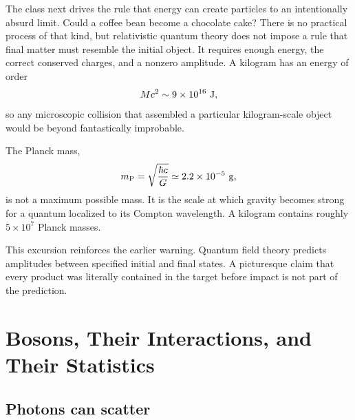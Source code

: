 The class next drives the rule that energy can create particles to an
intentionally absurd limit. Could a coffee bean become a chocolate cake?
There is no practical process of that kind, but relativistic quantum theory
does not impose a rule that final matter must resemble the initial object. It
requires enough energy, the correct conserved charges, and a nonzero
amplitude. A kilogram has an energy of order
\begin{equation}
  Mc^2\sim9\times10^{16}\ {\rm J},
\end{equation}
so any microscopic collision that assembled a particular kilogram-scale
object would be beyond fantastically improbable.

The Planck mass,
\begin{equation}
  m_{\rm P}=\sqrt{\frac{\hbar c}{G}}
  \simeq2.2\times10^{-5}\ {\rm g},
\end{equation}
is not a maximum possible mass. It is the scale at which gravity becomes
strong for a quantum localized to its Compton wavelength. A kilogram contains
roughly \(5\times10^7\) Planck masses.

\begin{classroomqa}
\end{classroomqa}

This excursion reinforces the earlier warning. Quantum field theory predicts
amplitudes between specified initial and final states. A picturesque claim
that every product was literally contained in the target before impact is
not part of the prediction.

\section{Bosons, Their Interactions, and Their Statistics}

\subsection{Photons can scatter}

